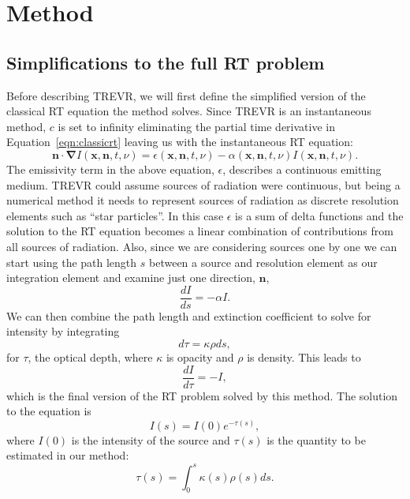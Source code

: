 \documentclass[fleq,usenatbib]{mnras}
\newcommand{\acro}{TREVR}
\begin{document}
{\section{Method}\label{sec:mthd}
\subsection{Simplifications to the full RT problem}\label{sec:rteq}
Before describing \acro{}, we will first define the simplified version of the 
classical RT equation the method solves. Since \acro{} is an instantaneous 
method, $c$ is set to infinity eliminating the partial time derivative in 
Equation~\ref{eqn:classicrt} leaving us with the instantaneous RT equation:
\begin{equation} \label{infcrt}
\mathbf{n \cdot \nabla} I\left(\mathbf{x}, \mathbf{n}, t, 
\nu\right) = \epsilon\left(\mathbf{x}, \mathbf{n}, t, \nu\right) - 
\alpha\left(\mathbf{x}, \mathbf{n}, t, \nu\right) 
I\left(\mathbf{x}, \mathbf{n}, t, \nu\right).
\end{equation}
The emissivity term in the above equation, $\epsilon$, describes a continuous 
emitting medium. \acro{} could assume sources of radiation were continuous, but 
being a numerical method it needs to represent sources of radiation as 
discrete resolution elements such as ``star particles''. In this case $\epsilon$ is a sum of delta 
functions and the solution to the RT equation becomes a linear combination of 
contributions from all sources of radiation. Also, since we are considering 
sources one by one we can start using the path length $s$ between a source and 
resolution element as our integration element and examine just one direction, $\mathbf{n}$,
\begin{equation}
\label{eqn:combtransfer}
\frac{dI}{ds} = -\alpha I.
\end{equation}
We can then combine the path length and extinction coefficient to solve for 
intensity by integrating 
\begin{equation}
\label{eqn:dtau}
d\tau = \kappa \rho ds, 
\end{equation}
for $\tau$, the optical depth, where $\kappa$ is opacity and $\rho$ is 
density. This leads to
\begin{equation}
\label{eqn:absorbtransfer}
\frac{dI}{d\tau} = -I,
\end{equation}
which is the final version of the RT problem solved by this method. The 
solution to the equation is 
\begin{equation}
\label{eqn:ient}
I(s) = I(0)e^{-\tau(s)},
\end{equation}
where $I(0)$ is the intensity of the source and $\tau(s)$ is the
quantity to be estimated in our method:
\begin{equation}
\label{eqn:tauint}
\tau(s) = \int_{0}^s \kappa(s) \rho(s) ds.
\end{equation}

}
\end{document}
